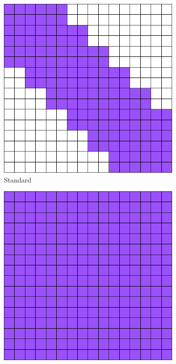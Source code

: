 \begin{figure}[!htb]
    \centering
    \begin{subfigure}[b]{0.47\linewidth}        %
        \centering
        \includegraphics[width=\linewidth]{Global}
        \caption{Standard}
    \end{subfigure}
    \begin{subfigure}[b]{0.47\linewidth}        %
        \centering
        \includegraphics[width=\linewidth]{B_extraction}

\end{subfigure}
\end{figure}
